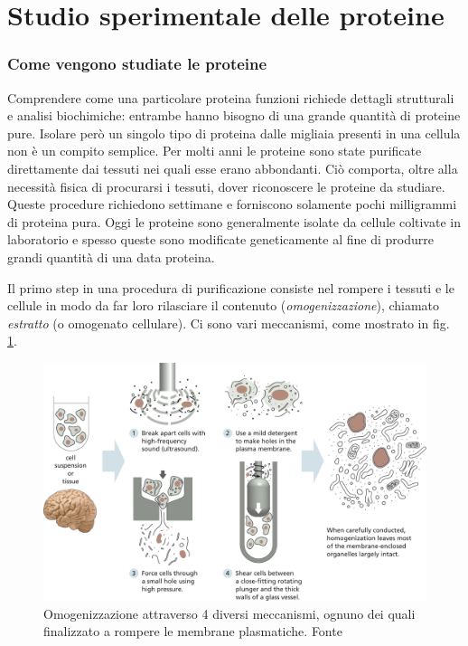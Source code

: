 \section{Studio sperimentale delle proteine} \label{sec:experimentally-guided-prediction}
{

\subsubsection{Come vengono studiate le proteine}
Comprendere come una particolare proteina funzioni richiede dettagli strutturali e analisi biochimiche: entrambe hanno bisogno di una grande quantità di proteine pure. Isolare però un singolo tipo di proteina dalle migliaia presenti in una cellula non è un compito semplice. Per molti anni le proteine sono state purificate direttamente dai tessuti nei quali esse erano abbondanti. Ciò comporta, oltre alla necessità fisica di procurarsi i tessuti, dover riconoscere le proteine da studiare. Queste procedure richiedono settimane e forniscono solamente pochi milligrammi di proteina pura. Oggi le proteine sono generalmente isolate da cellule coltivate in laboratorio e spesso queste sono modificate geneticamente al fine di produrre grandi quantità di una data proteina. \\

\par Il primo step in una procedura di purificazione consiste nel rompere i tessuti e le cellule in modo da far loro rilasciare il contenuto (\textit{omogenizzazione}), chiamato \textit{estratto} (o omogenato cellulare). Ci sono vari meccanismi, come mostrato in fig. \ref{fig:break-cells}. 


\begin{figure}[!htb]
	\centering
	\includegraphics[scale=0.5]{images/break-cells.png}
	\caption{Omogenizzazione attraverso 4 diversi meccanismi, ognuno dei quali finalizzato a rompere le membrane plasmatiche. Fonte\cite{alberts2018essential}}
	\label{fig:break-cells}
\end{figure}

}
